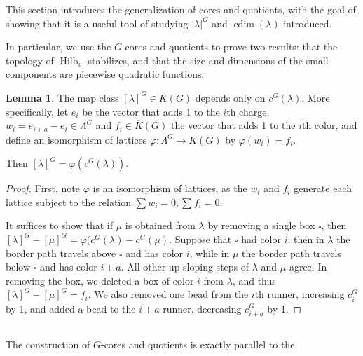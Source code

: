 \documentclass{amsart}[12pt]
\theoremstyle{definition}
\newtheorem{lemma}[dummy]{Lemma}
\DeclareMathOperator{\Hilb}{Hilb}
\DeclareMathOperator{\cdim}{cdim}
\begin{document}
This section introduces the generalization of cores and quotients, with the goal of showing that it is a useful tool of studying $|\lambda|^G$ and $\cdim(\lambda)$ introduced.

In particular, we use the $G$-cores and quotients to prove two results: that the topology of $\Hilb_v$ stabilizes, and that the size and dimensions of the small components are piecewise quadratic functions.

\begin{lemma}
  The map class $[\lambda]^G\in\overline{K}(G)$ depends only on $c^G(\lambda)$.  
More specifically, let $e_i$ be the vector that adds 1 to the $i$th charge, $w_i=e_{i+a}-e_i\in\Lambda^G$ and $f_i\in\overline{K}(G)$ the vector that adds 1 to the $i$th color, and define an isomorphism of lattices $\varphi:\Lambda^G\to\overline{K}(G)$ by $\varphi(w_i)=f_i$.

Then $[\lambda]^G=\varphi(c^G(\lambda))$.
\end{lemma}

\begin{proof}
First, note $\varphi$ is an isomorphism of lattices, as the $w_i$ and $f_i$ generate each lattice subject to the relation $\sum w_i=0, \sum f_i=0$.

It suffices to show that if $\mu$ is obtained from $\lambda$ by removing a single box $\square$, then $[\lambda]^G-[\mu]^G=\varphi(c^G(\lambda)-c^G(\mu)$.  Suppose that $\square$ had color $i$; then in $\lambda$ the border path travels above $\square$ and has color $i$, while in $\mu$ the border path travels below $\square$ and has color $i+a$.  All other up-sloping steps of $\lambda$ and $\mu$ agree.  In removing the box, we deleted a box of color $i$ from $\lambda$, and thus $[\lambda]^G-[\mu]^G=f_i$.  We also removed one bead from the $i$th runner, increasing $c^G_i$ by 1, and added a bead to the $i+a$ runner, decreasing $c^G_{i+a}$ by 1.




\end{proof}


\subsection{ }

The construction of $G$-cores and quotients is exactly parallel to the 
\end{document}

